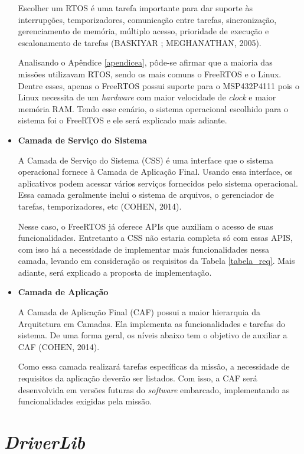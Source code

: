 \begin{itemize}
	Escolher um RTOS é uma tarefa importante para dar suporte às interrupções, temporizadores, comunicação entre tarefas, sincronização, gerenciamento de memória, múltiplo acesso, prioridade de execução e escalonamento de tarefas (BASKIYAR ; MEGHANATHAN, 2005).
	
	Analisando o Apêndice \ref{apendicea}, pôde-se afirmar que a maioria das missões utilizavam RTOS, sendo os mais comuns o FreeRTOS e o Linux. Dentre esses, apenas o FreeRTOS possui suporte para o MSP432P4111 pois o Linux necessita de um \textit{hardware} com maior velocidade de \textit{clock} e maior memória RAM. Tendo esse cenário, o sistema operacional escolhido para o sistema foi o FreeRTOS e ele será explicado mais adiante. 
	
	\item \textbf{Camada de Serviço do Sistema}
	
	A Camada de Serviço do Sistema (CSS) é uma interface que o sistema operacional fornece à Camada de Aplicação Final. Usando essa interface, os aplicativos podem acessar vários serviços fornecidos pelo sistema operacional. Essa camada geralmente inclui o sistema de arquivos, o gerenciador de tarefas, temporizadores, etc (COHEN, 2014).
	
	Nesse caso, o FreeRTOS já oferece APIs que auxiliam o acesso de suas funcionalidades. Entretanto a CSS não estaria completa só com essas APIS, com isso há a necessidade de implementar mais funcionalidades nessa camada, levando em consideração os requisitos da Tabela \ref{tabela_req}. Mais adiante, será explicado a proposta de implementação.
	
	
	\item \textbf{Camada de Aplicação}
	
	A Camada de Aplicação Final (CAF) possui a maior hierarquia da Arquitetura em Camadas. Ela implementa as funcionalidades e tarefas do sistema. De uma forma geral, os níveis abaixo tem o objetivo de auxiliar a CAF (COHEN, 2014).
	
	Como essa camada realizará tarefas específicas da missão, a necessidade de requisitos da aplicação deverão ser listados. Com isso, a CAF será desenvolvida em versões futuras do \textit{software} embarcado, implementando as funcionalidades exigidas pela missão.
	
	
	
\end{itemize}

\section{\textit{DriverLib}}

